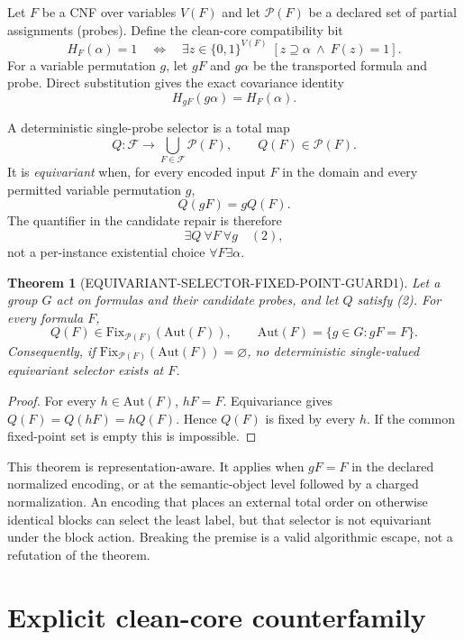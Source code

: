 \documentclass[11pt]{article}
\newtheorem{theorem}{Theorem}
\newcommand{\Aut}{\mathrm{Aut}}
\newcommand{\Fix}{\mathrm{Fix}}
\begin{document}
Let $F$ be a CNF over variables $V(F)$ and let $\mathcal P(F)$ be a declared set of partial assignments (probes).  Define the clean-core compatibility bit
\[
 H_F(\alpha)=1
 \quad\Longleftrightarrow\quad
 \exists z\in\{0,1\}^{V(F)}\;[z\supseteq\alpha\ \wedge\ F(z)=1].
\]
For a variable permutation $g$, let $gF$ and $g\alpha$ be the transported formula and probe.  Direct substitution gives the exact covariance identity
\[
 H_{gF}(g\alpha)=H_F(\alpha).                                      \tag{1}
\]

A deterministic single-probe selector is a total map
\[
 Q:\mathcal F\longrightarrow\bigcup_{F\in\mathcal F}\mathcal P(F),
 \qquad Q(F)\in\mathcal P(F).
\]
It is \emph{equivariant} when, for every encoded input $F$ in the domain and every permitted variable permutation $g$,
\[
 Q(gF)=gQ(F).                                                       \tag{2}
\]
The quantifier in the candidate repair is therefore
\[
 \exists Q\ \forall F\ \forall g\quad (2),
\]
not a per-instance existential choice $\forall F\exists\alpha$.

\begin{theorem}[EQUIVARIANT-SELECTOR-FIXED-POINT-GUARD1]
Let a group $G$ act on formulas and their candidate probes, and let $Q$ satisfy (2).  For every formula $F$,
\[
 Q(F)\in \Fix_{\mathcal P(F)}(\Aut(F)),
 \qquad
 \Aut(F)=\{g\in G:gF=F\}.
\]
Consequently, if $\Fix_{\mathcal P(F)}(\Aut(F))=\varnothing$, no deterministic single-valued equivariant selector exists at $F$.
\end{theorem}

\begin{proof}
For every $h\in\Aut(F)$, $hF=F$.  Equivariance gives
$Q(F)=Q(hF)=hQ(F)$.  Hence $Q(F)$ is fixed by every $h$.  If the common fixed-point set is empty this is impossible.
\end{proof}

This theorem is representation-aware.  It applies when $gF=F$ in the declared normalized encoding, or at the semantic-object level followed by a charged normalization.  An encoding that places an external total order on otherwise identical blocks can select the least label, but that selector is not equivariant under the block action.  Breaking the premise is a valid algorithmic escape, not a refutation of the theorem.

\section{Explicit clean-core counterfamily}
\end{document}
